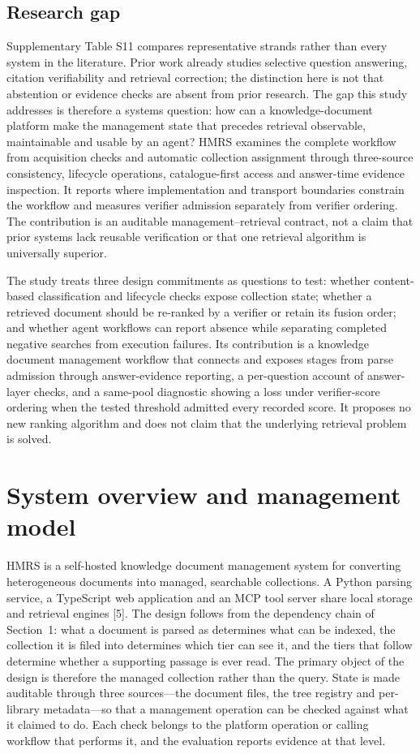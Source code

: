 \documentclass[11pt]{article}
\begin{document}
\subsection{Research gap}


Supplementary Table S11 compares representative strands rather than every
system in the literature. Prior work already studies selective question
answering, citation verifiability and retrieval correction; the distinction
here is not that abstention or evidence checks are absent from prior research.
The gap this study addresses is therefore a systems question: how can a
knowledge-document platform make the management state that precedes retrieval
observable, maintainable and usable by an agent? HMRS examines the complete
workflow from acquisition checks and automatic collection assignment through
three-source consistency, lifecycle operations, catalogue-first access and
answer-time evidence inspection. It reports where implementation and transport
boundaries constrain the workflow and measures verifier admission separately
from verifier ordering. The contribution is an auditable management--retrieval
contract, not a claim that prior systems lack reusable verification or that one
retrieval algorithm is universally superior.

The study treats three design commitments as questions to test: whether
content-based classification and lifecycle checks expose collection state;
whether a retrieved document should be re-ranked by a verifier or retain its
fusion order; and whether agent workflows can report absence while separating
completed negative searches from execution failures. Its contribution is a
knowledge document management workflow that connects and exposes stages from
parse admission through answer-evidence reporting, a per-question account of
answer-layer checks, and a same-pool diagnostic showing a loss under verifier-score ordering
when the tested threshold admitted every recorded score. It
proposes no new ranking algorithm and does not claim that the underlying
retrieval problem is solved.


\section{System overview and management model}


HMRS is a self-hosted knowledge document management system for converting
heterogeneous documents into managed, searchable collections. A Python
parsing service, a TypeScript web application and an MCP tool server share
local storage and retrieval engines [5]. The design follows from the
dependency chain of Section~1: what a document is parsed as
determines what can be indexed, the collection it is filed into determines
which tier can see it, and the tiers that follow determine whether a
supporting passage is ever read. The primary object of the design is therefore
the managed collection rather than the query. State is made auditable through
three sources---the document files, the tree registry and per-library
metadata---so that a management operation can be checked against what it
claimed to do. Each check belongs to the platform operation or calling
workflow that performs it, and the evaluation reports evidence at that level.
\end{document}
